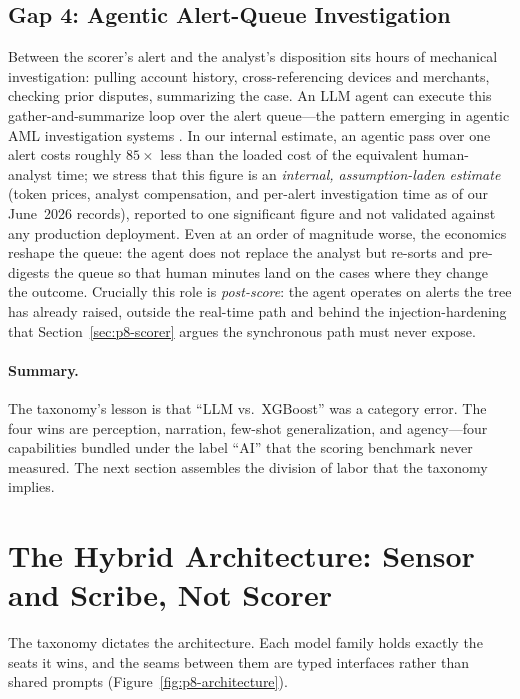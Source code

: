 \documentclass{article}
\providecommand{\secref}[1]{Section~\ref{#1}}
\providecommand{\figref}[1]{Figure~\ref{#1}}
\begin{document}
\subsection{Gap 4: Agentic Alert-Queue Investigation}
\label{sec:p8-gap-agentic}

Between the scorer's alert and the analyst's disposition sits hours of
mechanical investigation: pulling account history, cross-referencing devices
and merchants, checking prior disputes, summarizing the case. An LLM agent can
execute this gather-and-summarize loop over the alert queue---the pattern
emerging in agentic AML investigation systems \citep{naik2025coinvestigator,
pirmorad2025icl_aml}. In our internal estimate, an agentic pass over one alert
costs roughly $85\times$ less than the loaded cost of the equivalent
human-analyst time; we stress that this figure is an \emph{internal, assumption-laden
estimate} (token prices, analyst compensation, and per-alert
investigation time as of our June~2026 records), reported to one significant
figure and not validated against any production deployment. Even at an order
of magnitude worse, the economics reshape the queue: the agent does not
replace the analyst but re-sorts and pre-digests the queue so that human
minutes land on the cases where they change the outcome. Crucially this role
is \emph{post-score}: the agent operates on alerts the tree has already
raised, outside the real-time path and behind the injection-hardening that
\secref{sec:p8-scorer} argues the synchronous path must never expose.

\paragraph{Summary.} The taxonomy's lesson is that ``LLM vs.\ XGBoost'' was a
category error. The four wins are perception, narration, few-shot
generalization, and agency---four capabilities bundled under the label ``AI''
that the scoring benchmark never measured. The next section assembles the
division of labor that the taxonomy implies.
 \section{The Hybrid Architecture: Sensor and Scribe, Not Scorer}
\label{sec:p8-architecture}

The taxonomy dictates the architecture. Each model family holds exactly the
seats it wins, and the seams between them are typed interfaces rather than
shared prompts (\figref{fig:p8-architecture}).
\end{document}
